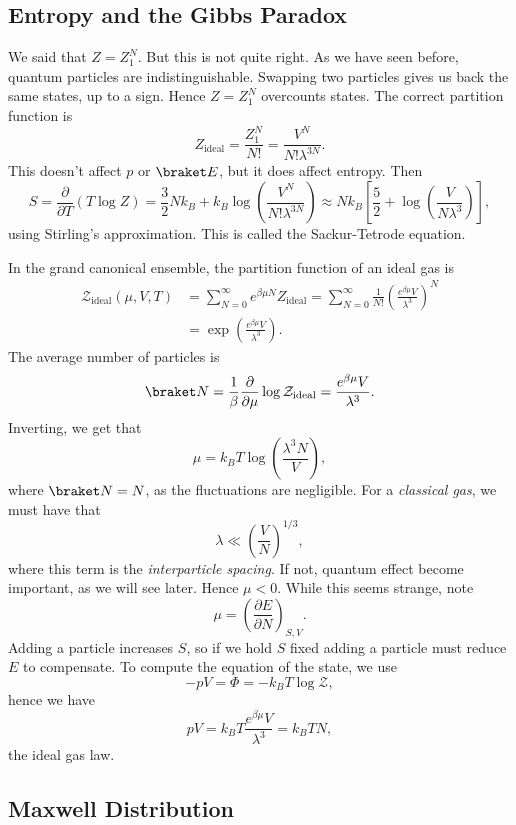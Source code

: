 \documentclass[12pt]{article}
\begin{document}
\subsection{Entropy and the Gibbs Paradox}
\label{sub:ent_gib_par}

We said that $Z = Z_1^N$. But this is not quite right. As we have seen before, quantum particles are indistinguishable. Swapping two particles gives us back the same states, up to a sign. Hence $Z = Z_1^N$ overcounts states. The correct partition function is
\[
Z_{\mathrm{ideal}} = \frac{Z_1^N}{N!} = \frac{V^N}{N! \lambda^{3N}}.
\]
This doesn't affect $p$ or $\braket E$, but it does affect entropy. Then
\[
	S = \frac{\partial}{\partial T}(T \log Z) = \frac{3}{2} N k_B + k_B \log \left( \frac{V^N}{N! \lambda^{3N}} \right) \approx N k_B \left[ \frac{5}{2} + \log \left( \frac{V}{N \lambda^3} \right) \right],
\]
using Stirling's approximation. This is called the Sackur-Tetrode equation.


In the grand canonical ensemble, the partition function of an ideal gas is
\begin{align*}
	\mathcal{Z}_{\mathrm{ideal}}(\mu, V, T) &= \sum_{N = 0}^\infty e^{\beta \mu N} Z_{\mathrm{ideal}} = \sum_{N = 0}^\infty \frac{1}{N!} \left( \frac{e^{\beta \mu}V}{\lambda^3} \right)^N \\
						&= \exp \left( \frac{e^{\beta \mu}V}{\lambda ^3} \right).
\end{align*}
The average number of particles is
\[
\braket N = \frac{1}{\beta} \frac{\partial}{\partial \mu} \log \mathcal{Z}_{\mathrm{ideal}} = \frac{e^{ \beta \mu} V}{\lambda^3}.
\]
Inverting, we get that
\[
\mu = k_B T \log \left( \frac{\lambda^3 N}{V} \right),
\]
where $\braket N = N$, as the fluctuations are negligible. For a \emph{classical gas}, we must have that
\[
\lambda \ll \left( \frac{V}{N} \right)^{1/3},
\]
where this term is the \emph{interparticle spacing}. If not, quantum effect become important, as we will see later. Hence $\mu < 0$. While this seems strange, note
\[
\mu = \left( \frac{\partial E}{\partial N} \right)_{S, V}.
\]
Adding a particle increases $S$, so if we hold $S$ fixed adding a particle must reduce $E$ to compensate. To compute the equation of the state, we use
\[
-pV = \Phi = -k_B T \log \mathcal{Z},
\]
hence we have
\[
pV = k_B T \frac{e^{\beta \mu}V}{\lambda ^3} = k_B T N,
\]
the ideal gas law.

\subsection{Maxwell Distribution}
\label{sub:max_dist}
\end{document}
